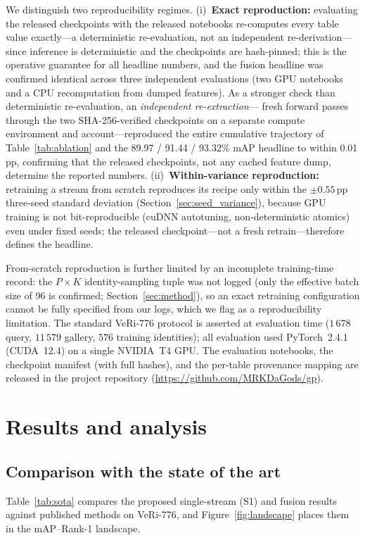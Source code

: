 \documentclass[10pt,a4paper]{article}
\begin{document}
We distinguish two reproducibility regimes. (i)~\textbf{Exact reproduction:}
evaluating the released checkpoints with the released notebooks re-computes
every table value exactly---a deterministic re-evaluation, not an independent
re-derivation---since inference is deterministic and the checkpoints are
hash-pinned; this is the operative guarantee for all headline numbers, and the
fusion headline was confirmed identical across three independent evaluations
(two GPU notebooks and a CPU recomputation from dumped features). As a stronger
check than deterministic re-evaluation, an \emph{independent re-extraction}---%
fresh forward passes through the two SHA-256-verified checkpoints on a separate
compute environment and account---reproduced the entire cumulative trajectory
of Table~\ref{tab:ablation} and the 89.97 / 91.44 / 93.32\% mAP headline to
within 0.01\,pp, confirming that the released checkpoints, not any cached
feature dump, determine the reported numbers. (ii)~\textbf{Within-variance
reproduction:} retraining a stream from scratch reproduces its recipe only
within the $\pm0.55$\,pp three-seed standard deviation
(Section~\ref{sec:seed_variance}), because GPU training is not bit-reproducible
(cuDNN autotuning, non-deterministic atomics) even under fixed seeds; the
released checkpoint---not a fresh retrain---therefore defines the headline.

From-scratch reproduction is further limited by an incomplete training-time
record: the $P\times K$ identity-sampling tuple was not logged (only the
effective batch size of 96 is confirmed; Section~\ref{sec:method}), so an exact
retraining configuration cannot be fully specified from our logs, which we flag
as a reproducibility limitation. The standard VeRi-776 protocol is asserted at
evaluation time ($1\,678$ query, $11\,579$ gallery, $576$ training identities);
all evaluation used PyTorch~2.4.1 (CUDA~12.4) on a single NVIDIA~T4 GPU. The
evaluation notebooks, the checkpoint manifest (with full hashes), and the
per-table provenance mapping are released in the project repository
(\url{https://github.com/MRKDaGods/gp}).

\section{Results and analysis}
\label{sec:results}

\subsection{Comparison with the state of the art}
Table~\ref{tab:sota} compares the proposed single-stream (S1) and fusion
results against published methods on VeRi-776, and Figure~\ref{fig:landscape}
places them in the mAP--Rank-1 landscape.
\end{document}
